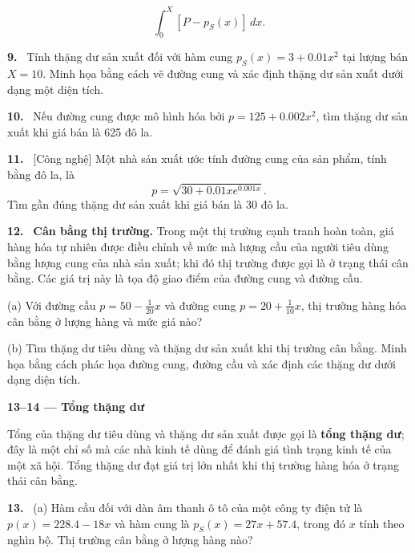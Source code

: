 \documentclass[12pt,a4paper]{article}
\newcommand{\bt}[1]{\par\smallskip\Needspace{5\baselineskip}\noindent\textbf{#1.}\ }
\newcommand{\group}[1]{\par\Needspace{11\baselineskip}\medskip\noindent\textbf{#1}\par\nopagebreak[4]}
\begin{document}
\[\int_{0}^{X}[P-p_S(x)]\,dx.\]
\bt{9} Tính thặng dư sản xuất đối với hàm cung $p_S(x)=3+0.01x^2$ tại lượng bán $X=10$. Minh họa bằng cách vẽ đường cung và xác định thặng dư sản xuất dưới dạng một diện tích.
\bt{10} Nếu đường cung được mô hình hóa bởi $p=125+0.002x^2$, tìm thặng dư sản xuất khi giá bán là 625 đô la.
\bt{11} [Công nghệ] Một nhà sản xuất ước tính đường cung của sản phẩm, tính bằng đô la, là
\[p=\sqrt{30+0.01xe^{0.001x}}.\]
Tìm gần đúng thặng dư sản xuất khi giá bán là 30 đô la.
\bt{12} \textbf{Cân bằng thị trường.} Trong một thị trường cạnh tranh hoàn toàn, giá hàng hóa tự nhiên được điều chỉnh về mức mà lượng cầu của người tiêu dùng bằng lượng cung của nhà sản xuất; khi đó thị trường được gọi là ở trạng thái cân bằng. Các giá trị này là tọa độ giao điểm của đường cung và đường cầu.

(a) Với đường cầu $p=50-\frac1{20}x$ và đường cung $p=20+\frac1{10}x$, thị trường hàng hóa cân bằng ở lượng hàng và mức giá nào?

(b) Tìm thặng dư tiêu dùng và thặng dư sản xuất khi thị trường cân bằng. Minh họa bằng cách phác họa đường cung, đường cầu và xác định các thặng dư dưới dạng diện tích.
\group{13–14 — Tổng thặng dư} Tổng của thặng dư tiêu dùng và thặng dư sản xuất được gọi là \textbf{tổng thặng dư}; đây là một chỉ số mà các nhà kinh tế dùng để đánh giá tình trạng kinh tế của một xã hội. Tổng thặng dư đạt giá trị lớn nhất khi thị trường hàng hóa ở trạng thái cân bằng.
\bt{13} (a) Hàm cầu đối với dàn âm thanh ô tô của một công ty điện tử là $p(x)=228.4-18x$ và hàm cung là $p_S(x)=27x+57.4$, trong đó $x$ tính theo nghìn bộ. Thị trường cân bằng ở lượng hàng nào?
\end{document}
